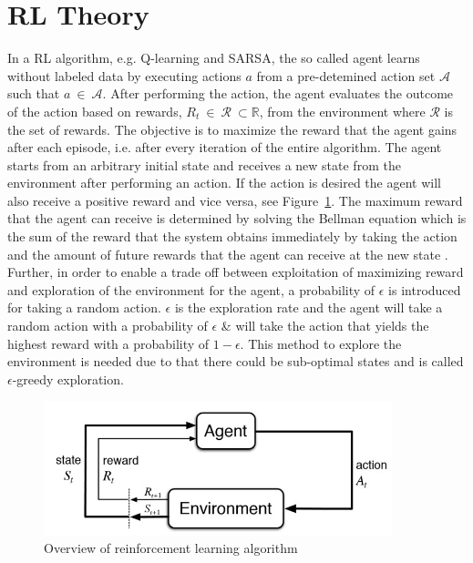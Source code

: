 \section{RL Theory}
 In a RL algorithm, e.g. Q-learning and SARSA, the so called agent learns without labeled data by executing actions $a$ from a pre-detemined action set $\mathcal{A}$ such that $a \: \in \: \mathcal{A}$. After performing the action, the agent evaluates the outcome of the action based on rewards, $R_t \: \in \: \mathcal{R} \: \subset \mathbb{R}$, from the environment where $\mathcal{R}$ is the set of rewards. The objective is to maximize the reward that the agent gains after each episode, i.e. after every iteration of the entire algorithm. The agent starts from an arbitrary initial state and receives a new state from the environment after performing an action. If the action is desired the agent will also receive a positive reward and vice versa, see Figure~\ref{fig:RLoverview}. The maximum reward that the agent can receive is determined by solving the Bellman equation which is the sum of the reward that the system obtains immediately by taking the action and the amount of future rewards that the agent can receive at the new state \cite{sutton2018reinforcement}. Further, in order to enable a trade off between exploitation of maximizing reward and exploration of the environment for the agent, a probability of $\epsilon$ is introduced for taking a random action. $\epsilon$ is the exploration rate and the agent will take a random action with a probability of $\epsilon$ \& will take the action that yields the highest reward with a probability of $1-\epsilon$. This method to explore the environment is needed due to that there could be sub-optimal states and is called $\epsilon$-greedy exploration. 

\begin{figure}[H]
  \centering
  \includegraphics[width=0.9\textwidth]{Images/RLoverview.jpg}
  \caption{Overview of reinforcement learning algorithm \cite{sutton2018reinforcement} } 
  \label{fig:RLoverview} 
\end{figure}

